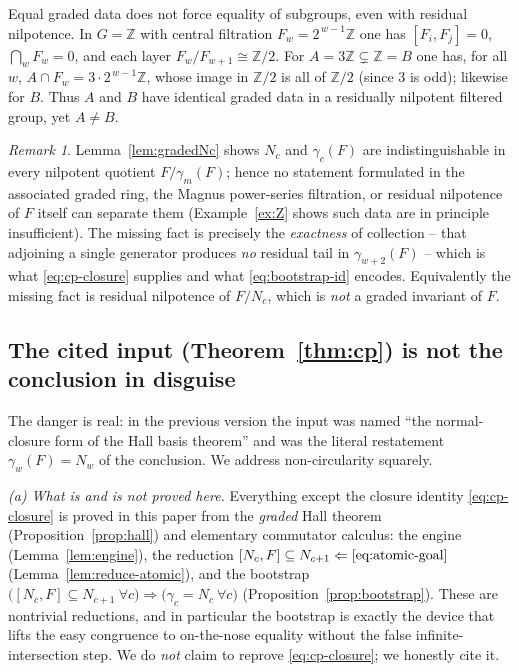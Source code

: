 \documentclass{amsart}
\theoremstyle{definition}
\theoremstyle{remark}
\newtheorem{remark}{Remark}
\begin{document}
\begin{example}\label{ex:Z}
Equal graded data does not force equality of subgroups, even with residual
nilpotence. In $G=\mathbb Z$ with central filtration $F_w=2^{\,w-1}\mathbb Z$ one
has $[F_i,F_j]=0$, $\bigcap_w F_w=0$, and each layer $F_w/F_{w+1}\cong\mathbb
Z/2$. For $A=3\mathbb Z\subsetneq\mathbb Z=B$ one has, for all $w$,
$A\cap F_w=3\cdot2^{\,w-1}\mathbb Z$, whose image in $\mathbb Z/2$ is all of
$\mathbb Z/2$ (since $3$ is odd); likewise for $B$. Thus $A$ and $B$ have identical
graded data in a residually nilpotent filtered group, yet $A\ne B$.
\end{example}

\begin{remark}\label{rem:graded-insufficient}
Lemma~\ref{lem:gradedNc} shows $N_c$ and $\gamma_c(F)$ are indistinguishable in
every nilpotent quotient $F/\gamma_m(F)$; hence no statement formulated in the
associated graded ring, the Magnus power-series filtration, or residual nilpotence
of $F$ itself can separate them (Example~\ref{ex:Z} shows such data are in
principle insufficient). The missing fact is precisely the \emph{exactness} of
collection -- that adjoining a single generator produces \emph{no} residual tail
in $\gamma_{w+2}(F)$ -- which is what \eqref{eq:cp-closure} supplies and what
\eqref{eq:bootstrap-id} encodes. Equivalently the missing fact is residual
nilpotence of $F/N_c$, which is \emph{not} a graded invariant of $F$.
\end{remark}

\subsection{The cited input (Theorem~\ref{thm:cp}) is not the conclusion in
disguise}

The danger is real: in the previous version the input was named ``the
normal-closure form of the Hall basis theorem'' and was the literal restatement
$\gamma_w(F)=N_w$ of the conclusion. We address non-circularity squarely.

\emph{(a) What is and is not proved here.} Everything except the closure identity
\eqref{eq:cp-closure} is proved in this paper from the \emph{graded} Hall theorem
(Proposition~\ref{prop:hall}) and elementary commutator calculus: the engine
(Lemma~\ref{lem:engine}), the reduction $[N_c,F]\subseteq N_{c+1}\Leftarrow
\eqref{eq:atomic-goal}$ (Lemma~\ref{lem:reduce-atomic}), and the bootstrap
$\big([N_c,F]\subseteq N_{c+1}\ \forall c\big)\Rightarrow\big(\gamma_c=N_c\ \forall
c\big)$ (Proposition~\ref{prop:bootstrap}). These are nontrivial reductions, and
in particular the bootstrap is exactly the device that lifts the easy congruence to
on-the-nose equality without the false infinite-intersection step. We do
\emph{not} claim to reprove \eqref{eq:cp-closure}; we honestly cite it.
\end{document}
